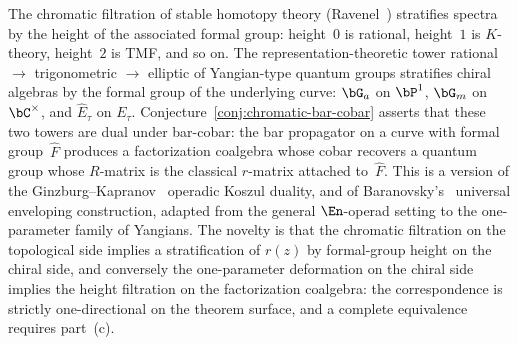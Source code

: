 \begin{remark}
\label{rem:chromatic-tower-correspondence}
The chromatic filtration of stable homotopy theory
\textup{(}Ravenel~\cite{Ravenel86}\textup{)} stratifies spectra by
the height of the associated formal group: height~$0$ is rational,
height~$1$ is $K$-theory, height~$2$ is TMF, and so on. The
representation-theoretic tower rational $\to$ trigonometric $\to$
elliptic of Yangian-type quantum groups stratifies chiral algebras
by the formal group of the underlying curve:
$\bG_a$ on $\bP^1$, $\bG_m$ on $\bC^\times$, and $\hat E_\tau$ on
$E_\tau$. Conjecture~\ref{conj:chromatic-bar-cobar} asserts that
these two towers are dual under bar-cobar: the bar propagator on a
curve with formal group~$\hat F$ produces a factorization coalgebra
whose cobar recovers a quantum group whose $R$-matrix is the
classical $r$-matrix attached to~$\hat F$. This is a version of
the Ginzburg--Kapranov~\cite{GK94} operadic Koszul duality, and of
Baranovsky's~\cite{Baranovsky08} universal enveloping construction,
adapted from the general $\En$-operad setting to the one-parameter
family of Yangians. The novelty is that the chromatic filtration
on the topological side implies a stratification of $r(z)$ by
formal-group height on the chiral side, and conversely the
one-parameter deformation on the chiral side implies the height
filtration on the factorization coalgebra: the correspondence is
strictly one-directional on the theorem surface, and a complete
equivalence requires part~\textup{(c)}.
\end{remark}


